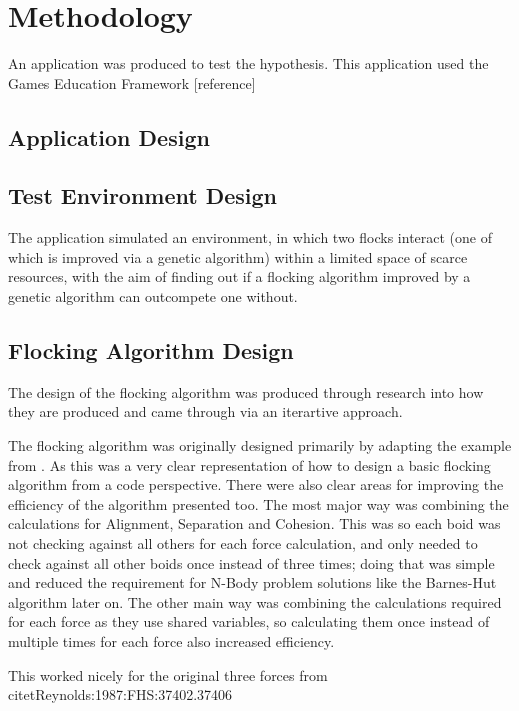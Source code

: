 
\section{Methodology}
An application was produced to test the hypothesis. This application used the Games Education Framework [reference] 

\subsection{Application Design}


\subsection{Test Environment Design}
The application simulated an environment, in which two flocks interact (one of which is improved via a genetic algorithm) within a limited space of scarce resources, with the aim of finding out if a flocking algorithm improved by a genetic algorithm can outcompete one without.

\subsection{Flocking Algorithm Design}
The design of the flocking algorithm was produced through research into how they are produced and came through via an iterartive approach.

The flocking algorithm was originally designed primarily by adapting the example from \citet{flockingprocessingorg}. As this was a very clear representation of how to design a basic flocking algorithm from a code perspective. There were also clear areas for improving the efficiency of the algorithm presented too. The most major way was combining the calculations for Alignment, Separation and Cohesion. This was so each boid was not checking against all others for each force calculation, and only needed to check against all other boids once instead of three times; doing that was simple and reduced the requirement for N-Body problem solutions like the Barnes-Hut algorithm later on. The other main way was combining the calculations required for each force as they use shared variables, so calculating them once instead of multiple times for each force also increased efficiency.

This worked nicely for the original three forces from citet{Reynolds:1987:FHS:37402.37406}

